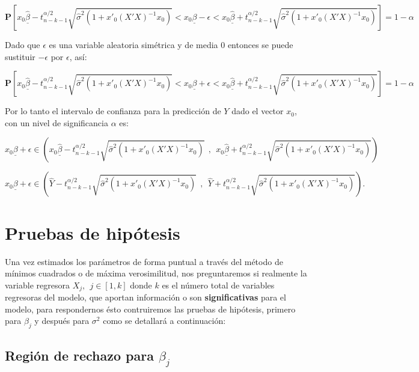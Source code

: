 \documentclass[a4paper,oneside,openany]{book}
\begin{document}
\[\mathbf{P}\left[x_{0}\underline{\hat{\beta}}-t^{\alpha/2}_{n-k-1}\sqrt{\hat{\sigma}^2\left(1+x'_{0}(X'X)^{-1}x_{0}\right)}<x_{0}\underline{\beta}-\epsilon<x_{0}\underline{\hat{\beta}}+t^{\alpha/2}_{n-k-1}\sqrt{\hat{\sigma}^2\left(1+x'_{0}(X'X)^{-1}x_{0}\right)}\right]=1-\alpha\]

Dado que \(\epsilon\) es una variable aleatoria simétrica y de media 0
entonces se puede sustituir \(-\epsilon\) por \(\epsilon\), así:

\[\mathbf{P}\left[x_{0}\underline{\hat{\beta}}-t^{\alpha/2}_{n-k-1}\sqrt{\hat{\sigma}^2\left(1+x'_{0}(X'X)^{-1}x_{0}\right)}<x_{0}\underline{\beta}+\epsilon<x_{0}\underline{\hat{\beta}}+t^{\alpha/2}_{n-k-1}\sqrt{\hat{\sigma}^2\left(1+x'_{0}(X'X)^{-1}x_{0}\right)}\right]=1-\alpha\]

Por lo tanto el intervalo de confianza para la predicción de \(Y\) dado
el vector \(x_{0}\), con un nivel de significancia \(\alpha\) es:

\[x_{0}\underline{\beta}+\epsilon \in\left(x_{0}\underline{\hat{\beta}}-t^{\alpha/2}_{n-k-1}\sqrt{\hat{\sigma}^2\left(1+x'_{0}(X'X)^{-1}x_{0}\right)} \ \ , \ \ x_{0}\underline{\hat{\beta}}+t^{\alpha/2}_{n-k-1}\sqrt{\hat{\sigma}^2\left(1+x'_{0}(X'X)^{-1}x_{0}\right)}\right)\]

\[x_{0}\underline{\beta}+\epsilon \in \left(\hat{Y}-t^{\alpha/2}_{n-k-1}\sqrt{\hat{\sigma}^2\left(1+x'_{0}(X'X)^{-1}x_{0}\right)} \ \ , \ \ \hat{Y}+t^{\alpha/2}_{n-k-1}\sqrt{\hat{\sigma}^2\left(1+x'_{0}(X'X)^{-1}x_{0}\right)}\right).\]

\section{Pruebas de hipótesis}\label{pruebas-de-hipuxf3tesis-1}

Una vez estimados los parámetros de forma puntual a través del método de
mínimos cuadrados o de máxima verosimilitud, nos preguntaremos si
realmente la variable regresora \(X_{j}, \ \ j \in [1,k]\) donde \(k\)
es el número total de variables regresoras del modelo, que aportan
información o son \textbf{significativas} para el modelo, para
respondernos ésto contruiremos las pruebas de hipótesis, primero para
\(\beta_{j}\) y después para \(\sigma^2\) como se detallará a
continuación:

\subsection{\texorpdfstring{Región de rechazo para
\(\beta_{j}\)}{Región de rechazo para \textbackslash{}beta\_\{j\}}}\label{regiuxf3n-de-rechazo-para-beta_j}
\end{document}
